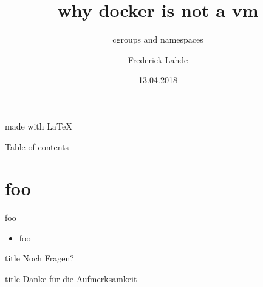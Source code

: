 \documentclass[14pt]{beamer}
\author{
    Frederick Lahde
  }
\title[]{why docker is not a vm}
\subtitle{cgroups and namespaces}
\institute{Hochschule Emden/Leer}
\date{13.04.2018}
\begin{document}
    \begin{frame}[plain]
      \maketitle
      \centering
      \begin{figure}[H]
      \end{figure}
      \tiny{made with \LaTeX}
    \end{frame}
  
    \begin{frame}{Table of contents}
      \setcounter{tocdepth}{1}
      \tableofcontents
    \end{frame}
  

    \section{foo}
    \begin{frame}{foo}
      \begin{itemize}
        \item foo
      \end{itemize}
    \end{frame}
    


    \begin{frame}
      \vfill
      \centering
      \begin{beamercolorbox}[sep=8pt,center,shadow=true,rounded=true]{title}
        Noch Fragen?
      \end{beamercolorbox}
      \vfill
    \end{frame}
  
    \begin{frame}
      \vfill
      \centering
      \begin{beamercolorbox}[sep=8pt,center,shadow=true,rounded=true]{title}
        Danke für die Aufmerksamkeit
      \end{beamercolorbox}
      \vfill
    \end{frame}
  
\end{document}
